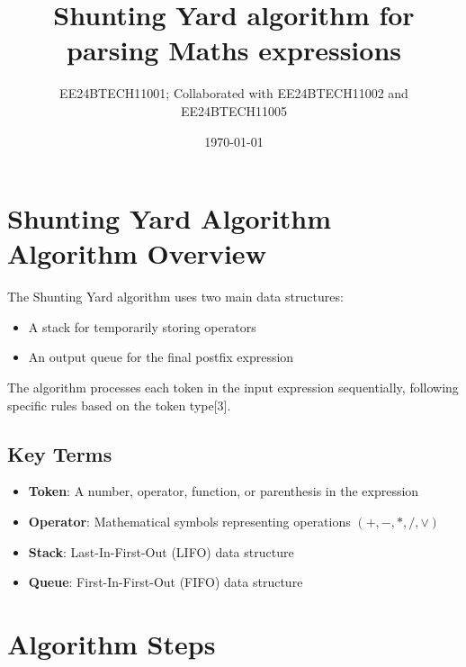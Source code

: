 \documentclass[a4paper,12pt]{article}
\title{Shunting Yard algorithm for parsing Maths expressions}
\author{EE24BTECH11001; Collaborated with EE24BTECH11002 and EE24BTECH11005}
\date{\today}
\begin{document}
\maketitle

\section{Shunting Yard Algorithm Algorithm Overview}

The Shunting Yard algorithm uses two main data structures:
\begin{itemize}
    \item A stack for temporarily storing operators
    \item An output queue for the final postfix expression
\end{itemize}

The algorithm processes each token in the input expression sequentially, following specific rules based on the token type[3].

\subsection{Key Terms}

\begin{itemize}
    \item \textbf{Token}: A number, operator, function, or parenthesis in the expression
    \item \textbf{Operator}: Mathematical symbols representing operations $(+, -, *, /, \vee)$
    \item \textbf{Stack}: Last-In-First-Out (LIFO) data structure
    \item \textbf{Queue}: First-In-First-Out (FIFO) data structure
\end{itemize}

\section{Algorithm Steps}
\end{document}
